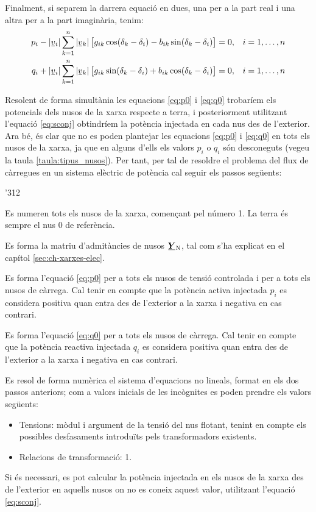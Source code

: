 Finalment, si separem la darrera equació en dues, una per a  la part real i  una altra per
a la part imaginària, tenim:
\begin{align}
    p_i - |\cmplx{v}_i| \sum^n_{k=1}  |\cmplx{v}_k|\, \bigl[ g_{ik} \cos(\delta_k - \delta_i) -
     b_{ik} \sin(\delta_k - \delta_i) \bigr] &= 0,  & i&=1,\ldots,n\label{eq:p0} \\
    q_i + |\cmplx{v}_i| \sum^n_{k=1}  |\cmplx{v}_k| \,\bigl[ g_{ik} \sin(\delta_k - \delta_i) +
      b_{ik} \cos(\delta_k - \delta_i) \bigr] &= 0, & i&=1,\ldots,n\label{eq:q0}
\end{align}

Resolent de forma simultània les equacions \eqref{eq:p0} i
\eqref{eq:q0} trobaríem els potencials dels nusos de la xarxa
respecte a  terra, i posteriorment utilitzant l'equació
\eqref{eq:sconj} obtindríem la potència injectada en cada nus des
de l'exterior. Ara bé, és clar que no es poden plantejar les
equacions \eqref{eq:p0} i \eqref{eq:q0} en tots els nusos de la
xarxa, ja que en alguns d'ells els valors $p_i$ o $q_i$ són
desconeguts (vegeu la taula \vref{taula:tipus_nusos}). Per tant, per
tal de resoldre el problema del flux de càrregues en un sistema
elèctric de potència cal seguir els passos següents:
\begin{dingautolist}{'312}
    \item Es numeren tots els nusos de la xarxa, començant pel número 1. La terra és sempre el nus 0 de referència.
   \item Es forma la matriu d'admitàncies de nusos $\mcmplx{Y}\ped{N}$, tal com s'ha
   explicat en el capítol \ref{sec:ch-xarxes-elec}.
   \item Es forma l'equació \eqref{eq:p0} per a tots els nusos de tensió controlada i per
   a tots els nusos de càrrega. Cal tenir en compte que la potència activa  injectada $p_i$ es considera
   positiva quan entra des de l'exterior a la xarxa i negativa en cas contrari.
   \item Es forma l'equació \eqref{eq:q0} per a tots els nusos de càrrega. Cal tenir en compte
   que la potència reactiva injectada $q_i$  es considera positiva quan entra des de l'exterior a la xarxa i negativa en cas contrari.
   \item Es resol de forma numèrica el sistema d'equacions no lineals, format en els dos
   passos anteriors; com a valors inicials de les incògnites es poden prendre els valors
   següents:
   \begin{itemize}
    \item Tensions: mòdul i argument de la tensió del nus flotant, tenint en compte els possibles desfasaments introduïts pels transformadors existents.
       \item Relacions de transformació: 1.
   \end{itemize}
   \item Si és necessari,  es pot calcular la potència injectada en els nusos de la xarxa
   des de l'exterior en aquells nusos on no es
   coneix aquest valor, utilitzant    l'equació \eqref{eq:sconj}.
\end{dingautolist}


